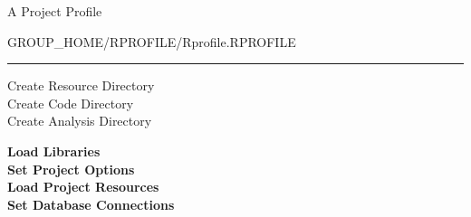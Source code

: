 \documentclass{beamer}
\begin{document}
\begin{frame}{A Project Profile}

\begin{center} GROUP\_HOME/RPROFILE/Rprofile.RPROFILE\\ \end{center}
\begin{center}
\rule{4cm}{0.6pt}
\end{center}

\begin{center}
Create Resource Directory\\
Create Code Directory \\ 
Create Analysis Directory\\
\end{center}

\textbf{Load Libraries\\}
\textbf{Set Project Options\\}
\textbf{Load Project Resources\\}
\textbf{Set Database Connections\\}

\end{frame}
\end{document}
